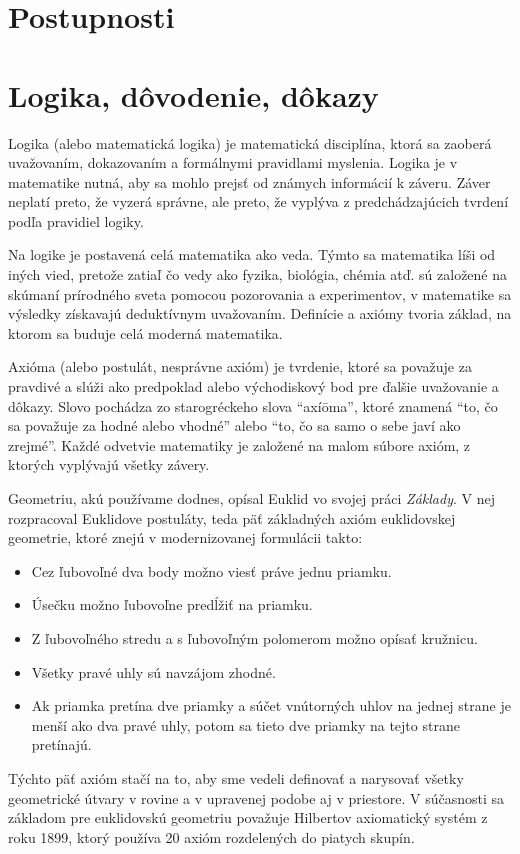 \documentclass{report}
\begin{document}
\chapter{Postupnosti}

\chapter{Logika, dôvodenie, dôkazy}

Logika (alebo matematická logika) je matematická disciplína, ktorá sa zaoberá uvažovaním, dokazovaním a formálnymi pravidlami myslenia. Logika je v matematike nutná, aby sa mohlo prejsť od známych informácií k záveru. Záver neplatí preto, že vyzerá správne, ale preto, že vyplýva z predchádzajúcich tvrdení podľa pravidiel logiky.

Na logike je postavená celá matematika ako veda. Týmto sa matematika líši od iných vied, pretože zatiaľ čo vedy ako fyzika, biológia, chémia atď. sú založené na skúmaní prírodného sveta pomocou pozorovania a experimentov, v matematike sa výsledky získavajú deduktívnym uvažovaním. Definície a axiómy tvoria základ, na ktorom sa buduje celá moderná matematika.

Axióma (alebo postulát, nesprávne axióm) je tvrdenie, ktoré sa považuje za pravdivé a slúži ako predpoklad alebo východiskový bod pre ďalšie uvažovanie a dôkazy. Slovo pochádza zo starogréckeho slova \enquote{axíōma}, ktoré znamená \enquote{to, čo sa považuje za hodné alebo vhodné} alebo \enquote{to, čo sa samo o sebe javí ako zrejmé}. Každé odvetvie matematiky je založené na malom súbore axióm, z ktorých vyplývajú všetky závery.

Geometriu, akú používame dodnes, opísal Euklid vo svojej práci \emph{Základy}. V nej rozpracoval Euklidove postuláty, teda päť základných axióm euklidovskej geometrie, ktoré znejú v modernizovanej formulácii takto:
\begin{itemize}
  \item Cez ľubovoľné dva body možno viesť práve jednu priamku.
  \item Úsečku možno ľubovoľne predĺžiť na priamku.
  \item Z ľubovoľného stredu a s ľubovoľným polomerom možno opísať kružnicu.
  \item Všetky pravé uhly sú navzájom zhodné.
  \item Ak priamka pretína dve priamky a súčet vnútorných uhlov na jednej strane je menší ako dva pravé uhly, potom sa tieto dve priamky na tejto strane pretínajú.
\end{itemize}
Týchto päť axióm stačí na to, aby sme vedeli definovať a narysovať všetky geometrické útvary v rovine a v upravenej podobe aj v priestore. V súčasnosti sa základom pre euklidovskú geometriu považuje Hilbertov axiomatický systém z roku 1899, ktorý používa 20 axióm rozdelených do piatych skupín.
\end{document}
